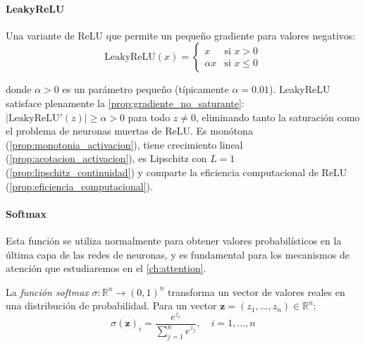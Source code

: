 \paragraph{LeakyReLU}

Una variante de \gls{ReLU} que permite un pequeño gradiente para valores negativos:
\[
\text{LeakyReLU}(x) = \begin{cases}
x & \text{si } x > 0 \\
\alpha x & \text{si } x \leq 0
\end{cases}
\]

donde $\alpha > 0$ es un parámetro pequeño (típicamente $\alpha = 0.01$). LeakyReLU satisface plenamente la \autoref{prop:gradiente_no_saturante}: $|\text{LeakyReLU}'(z)| \geq \alpha > 0$ para todo $z \neq 0$, eliminando tanto la saturación como el problema de neuronas muertas de ReLU. Es monótona (\autoref{prop:monotonia_activacion}), tiene crecimiento lineal (\autoref{prop:acotacion_activacion}), es Lipschitz con $L = 1$ (\autoref{prop:lipschitz_continuidad}) y comparte la eficiencia computacional de ReLU (\autoref{prop:eficiencia_computacional}).

\paragraph{Softmax}

Esta función se utiliza normalmente para obtener valores probabilísticos en la última capa de las redes de neuronas, y es fundamental para los mecanismos de atención que estudiaremos en el \autoref{ch:attention}.

\begin{definition}\label{def:softmax}
La \textit{función softmax} $\sigma: \mathbb{R}^n \to (0,1)^n$ transforma un vector de valores reales en una distribución de probabilidad. Para un vector $\mathbf{z} = (z_1, \ldots, z_n) \in \mathbb{R}^n$:
\begin{equation}\label{eq:softmax}
\sigma(\mathbf{z})_i = \frac{e^{z_i}}{\sum_{j=1}^{n} e^{z_j}}, \quad i = 1, \ldots, n
\end{equation}
\end{definition}

